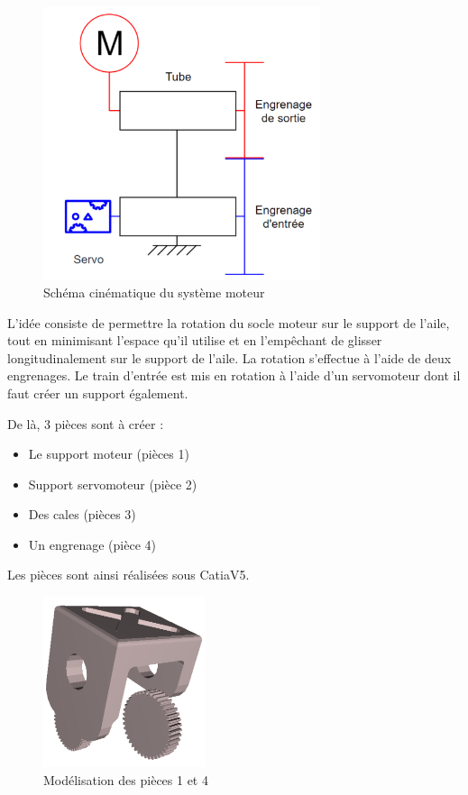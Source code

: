 \documentclass[a4paper,12pt,french]{report}
\begin{document}
\begin{figure}[h]
    \centering
    \includegraphics[height=8cm]{figures/cinemot.jpeg}
    \caption{Schéma cinématique du système moteur}
\end{figure}

L’idée consiste de permettre la rotation du socle moteur sur le support de l’aile, tout en minimisant l’espace qu’il utilise et en l’empêchant de glisser longitudinalement sur le support de l’aile. La rotation s’effectue à l’aide de deux engrenages. Le train d’entrée est mis en rotation à l’aide d’un servomoteur dont il faut créer un support également.\newline

De là, 3 pièces sont à créer :
\begin{itemize}
    \item Le support moteur (pièces 1)
    \item Support servomoteur (pièce 2)
    \item Des cales (pièces 3)
    \item Un engrenage (pièce 4)\newline
\end{itemize}

Les pièces sont ainsi réalisées sous CatiaV5.

\begin{figure}[h]
    \centering
    \includegraphics[height=5cm]{figures/mot1.png}
    \caption{Modélisation des pièces 1 et 4}
\end{figure}
\end{document}
